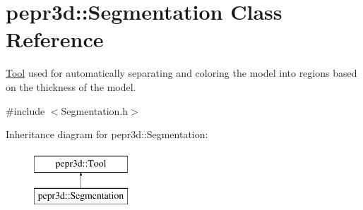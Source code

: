 \hypertarget{classpepr3d_1_1_segmentation}{}\section{pepr3d\+::Segmentation Class Reference}
\label{classpepr3d_1_1_segmentation}


\mbox{\hyperlink{classpepr3d_1_1_tool}{Tool}} used for automatically separating and coloring the model into regions based on the thickness of the model.  




{\ttfamily \#include $<$Segmentation.\+h$>$}

Inheritance diagram for pepr3d\+::Segmentation\+:\begin{figure}[H]
\begin{center}
\leavevmode
\includegraphics[height=2.000000cm]{classpepr3d_1_1_segmentation}
\end{center}
\end{figure}
